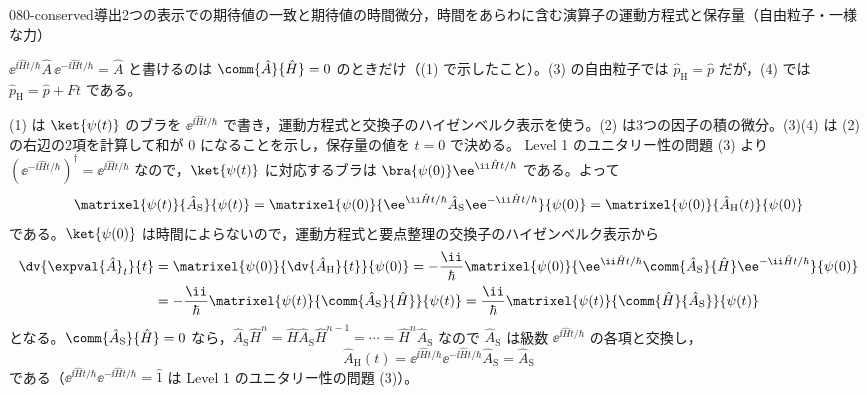\documentclass[uplatex,dvipdfmx,a4paper,11pt]{jsarticle}
\begin{document}
\begin{mondai}{080-conserved}{導出}{2つの表示での期待値の一致と期待値の時間微分，時間をあらわに含む演算子の運動方程式と保存量（自由粒子・一様な力）}
\begin{kizuki}
\item $\ee^{\ii\hat{H}t/\hbar}\hat{A}\,\ee^{-\ii\hat{H}t/\hbar}=\hat{A}$ と書けるのは $\comm{\hat{A}}{\hat{H}}=0$ のときだけ（(1) で示したこと）。(3) の自由粒子では $\hat{p}_{\mathrm{H}}=\hat{p}$ だが，(4) では $\hat{p}_{\mathrm{H}}=\hat{p}+Ft$ である。
\end{kizuki}
\begin{tadashii}
\houshin (1) は $\ket{\psi(t)}$ のブラを $\ee^{\ii\hat{H}t/\hbar}$ で書き，運動方程式と交換子のハイゼンベルク表示を使う。(2) は3つの因子の積の微分。(3)(4) は (2) の右辺の2項を計算して和が $0$ になることを示し，保存量の値を $t=0$ で決める。
\keisan {} Level 1 のユニタリー性の問題 (3) より $(\ee^{-\ii\hat{H}t/\hbar})^{\dagger}=\ee^{\ii\hat{H}t/\hbar}$ なので，$\ket{\psi(t)}$ に対応するブラは $\bra{\psi(0)}\ee^{\ii\hat{H}t/\hbar}$ である。よって
\[ \matrixel{\psi(t)}{\hat{A}_{\mathrm{S}}}{\psi(t)}=\matrixel{\psi(0)}{\ee^{\ii\hat{H}t/\hbar}\hat{A}_{\mathrm{S}}\ee^{-\ii\hat{H}t/\hbar}}{\psi(0)}=\matrixel{\psi(0)}{\hat{A}_{\mathrm{H}}(t)}{\psi(0)} \]
である。$\ket{\psi(0)}$ は時間によらないので，運動方程式と要点整理の交換子のハイゼンベルク表示から
\begin{align*}
\dv{\expval{\hat{A}}_{t}}{t}&=\matrixel{\psi(0)}{\dv{\hat{A}_{\mathrm{H}}}{t}}{\psi(0)}=-\frac{\ii}{\hbar}\matrixel{\psi(0)}{\ee^{\ii\hat{H}t/\hbar}\comm{\hat{A}_{\mathrm{S}}}{\hat{H}}\ee^{-\ii\hat{H}t/\hbar}}{\psi(0)}\\
&=-\frac{\ii}{\hbar}\matrixel{\psi(t)}{\comm{\hat{A}_{\mathrm{S}}}{\hat{H}}}{\psi(t)}=\frac{\ii}{\hbar}\matrixel{\psi(t)}{\comm{\hat{H}}{\hat{A}_{\mathrm{S}}}}{\psi(t)}
\end{align*}
となる。$\comm{\hat{A}_{\mathrm{S}}}{\hat{H}}=0$ なら，$\hat{A}_{\mathrm{S}}\hat{H}^{n}=\hat{H}\hat{A}_{\mathrm{S}}\hat{H}^{n-1}=\cdots=\hat{H}^{n}\hat{A}_{\mathrm{S}}$ なので $\hat{A}_{\mathrm{S}}$ は級数 $\ee^{\ii\hat{H}t/\hbar}$ の各項と交換し，
\[ \hat{A}_{\mathrm{H}}(t)=\ee^{\ii\hat{H}t/\hbar}\ee^{-\ii\hat{H}t/\hbar}\hat{A}_{\mathrm{S}}=\hat{A}_{\mathrm{S}} \]
である（$\ee^{\ii\hat{H}t/\hbar}\ee^{-\ii\hat{H}t/\hbar}=\hat{1}$ は Level 1 のユニタリー性の問題 (3)）。


\end{tadashii}
\end{mondai}
\end{document}
